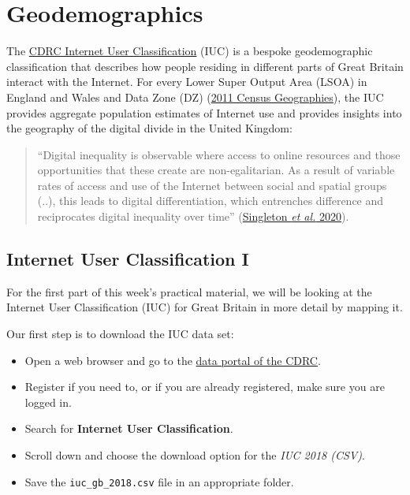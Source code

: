 \documentclass[
  letterpaper,
  DIV=11,
  numbers=noendperiod]{scrreprt}
\providecommand{\tightlist}{%
  \setlength{\itemsep}{0pt}\setlength{\parskip}{0pt}}\usepackage{longtable,booktabs,array}
\begin{document}
\hypertarget{geodemographics-1}{%
\section{Geodemographics}\label{geodemographics-1}}

The
\href{https://data.cdrc.ac.uk/dataset/internet-user-classification}{CDRC
Internet User Classification} (IUC) is a bespoke geodemographic
classification that describes how people residing in different parts of
Great Britain interact with the Internet. For every Lower Super Output
Area (LSOA) in England and Wales and Data Zone (DZ)
(\href{https://www.ons.gov.uk/methodology/geography/ukgeographies/censusgeography}{2011
Census Geographies}), the IUC provides aggregate population estimates of
Internet use and provides insights into the geography of the digital
divide in the United Kingdom:

\begin{quote}
``Digital inequality is observable where access to online resources and
those opportunities that these create are non-egalitarian. As a result
of variable rates of access and use of the Internet between social and
spatial groups (..), this leads to digital differentiation, which
entrenches difference and reciprocates digital inequality over time''
(\href{https://doi.org/10.1016/j.compenvurbsys.2020.101486}{Singleton
\emph{et al.} 2020}).
\end{quote}

\hypertarget{internet-user-classification-i}{%
\subsection{Internet User Classification
I}\label{internet-user-classification-i}}

For the first part of this week's practical material, we will be looking
at the Internet User Classification (IUC) for Great Britain in more
detail by mapping it.

Our first step is to download the IUC data set:

\begin{itemize}
\tightlist
\item
  Open a web browser and go to the \href{https://data.cdrc.ac.uk}{data
  portal of the CDRC}.
\item
  Register if you need to, or if you are already registered, make sure
  you are logged in.
\item
  Search for \textbf{Internet User Classification}.
\item
  Scroll down and choose the download option for the \emph{IUC 2018
  (CSV)}.
\item
  Save the \texttt{iuc\_gb\_2018.csv} file in an appropriate folder.
\end{itemize}
\end{document}
